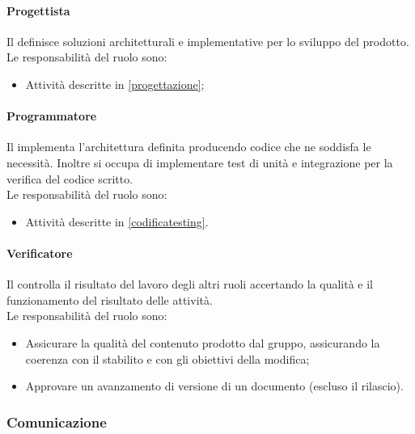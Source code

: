 \paragraph{Progettista}
Il \Progettista{} definisce soluzioni architetturali e implementative per lo sviluppo del prodotto.\\
Le responsabilità del ruolo sono:
\begin{itemize}
  \item Attività descritte in \ref{progettazione};
\end{itemize}

\paragraph{Programmatore}
Il \Programmatore{} implementa l'architettura definita producendo codice che ne soddisfa le necessità. Inoltre si occupa di implementare test di unità e integrazione per la verifica del codice scritto.\\
Le responsabilità del ruolo sono:
\begin{itemize}
  \item Attività descritte in \ref{codificatesting}.
\end{itemize}

\paragraph{Verificatore}
Il \Verificatore{} controlla il risultato del lavoro degli altri ruoli accertando la qualità e il funzionamento del risultato delle attività.\\
Le responsabilità del ruolo sono:
\begin{itemize}
  \item Assicurare la qualità del contenuto prodotto dal gruppo, assicurando la coerenza con il \WoW{} stabilito e con gli obiettivi della modifica;
  \item Approvare un avanzamento di versione di un documento (escluso il rilascio).
\end{itemize}

\subsubsection{Comunicazione}
